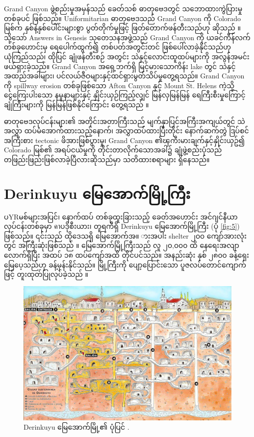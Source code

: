 \documentclass[10pt,twocolumn,letterpaper]{article}
\begin{document}
Grand Canyon ဖွဲ့စည်းမှုအမှန်သည် ခေတ်သစ် ဓာတုဗေဒတွင် သဘောထားကွဲပြားမှုတစ်ခုပင် ဖြစ်သည်။ Uniformitarian ဓာတုဗေဒသည် Grand Canyon ကို Colorado မြစ်က နှစ်နဲ့နှစ်ပေါင်းများစွာ ပွတ်တိုက်မှုဖြင့် ဖြတ်တောက်ဖန်တီးသည်ဟု ဆိုသည် \cite{47}။ သို့သော် Answers in Genesis သုတေသနအဖွဲ့သည် Grand Canyon ကို ယခင်ကီန်လက်တစ်ခုဟောင်းမှ ရေပေါက်ထွက်၍ တစ်ပတ်အတွင်းတင် ဖြစ်ပေါ်လာခဲ့နိုင်သည်ဟု ယုံကြည်သည်၊ ထိုပြင် ချုံဖန်တီးစဉ် အတွင်း သဲနှင့်လောင်းထူထပ်များကို အလွန်အမင်း ဖယ်ရှားခဲ့သည်။ Grand Canyon အရှေ့ဘက်ရှိ မြင့်မားသောကိန်း lake တွင် သဲနှင့်အထည်အခါများ၊ ပင်လယ်ဇီဝများနှင့်ထင်ရှားမွတ်သိပ်မှုတွေ့ရသည်။ Grand Canyon ကို spillway erosion တစ်ခုဖြစ်သော Afton Canyon နှင့် Mount St. Helens ကဲ့သို့ ငွေကြေးပါးသော နမူနာများနှင့် နှိုင်းယှဉ်ကြည့်လျှင် မြန်လှမြန်မြန် ရေကြီးစီးမှုကြောင့် ချုံကြီးများကို မြန်မြန်ဖြစ်နိုင်ကြောင်း တွေ့ရသည် \cite{48}။

ဓာတုဗေဒလုပ်ငန်းများ၏ အတိုင်းအတာကြီးသည် မျက်နှာပြင်အကြီးအကျယ်တွင် သဲအလွှာ ထပ်မံအောက်ထားသည့်နောက်၊ အလွှာထပ်ထားပြီးတိုင်း နောက်ဆက်တွဲ ဒြပ်စင်အကြီးစား tectonic ဖိအားဖြစ်ပွားမှု၊ Grand Canyon ၏ၾကီးမားချက်နှင့်နှိုင်းယှဥ်၍ Colorado မြစ်၏ အရပ်ငယ်မှုကို တိုင်းတာလိုက်သောအခါ၌ ချုံဖွဲ့စည်းပုံသည် တဖြည်းဖြည်းဖြစ်လာခဲ့ပြီလားဆိုသည်မှာ သတိထားစရာများ ရှိနေသည်။

\section{Derinkuyu မြေအောက်မြို့ကြီး}

ပYRမစ်များအပြင်၊ နောက်ထပ် တစ်ခုထူးခြားသည့် ခေတ်အဟောင်း အင်ဂျင်နီယာလုပ်ငန်းတစ်ခုမှာ คาပဒိုစီးယား၊ တူရကီရှိ Derinkuyu မြေအောက်မြို့ကြီး (ပုံ \ref{fig:5}) ဖြစ်သည်။ ၎င်းသည် ထိုဒေသရှိ မြေအောက်အ။
ားအပါး shelter ၂၀၀ ကျော်အားလုံးတွင် အကြီးဆုံးဖြစ်သည် \cite{54}။ မြေအောက်မြို့ကြီးသည် လူ ၂၀,၀၀၀ ထိ နေရေးအလျာလောက်ရှိပြီး အထပ် ၁၈ ထပ်ကျော်အထိ တိုင်ပင်သည်။ အနည်းဆုံး နှစ် ၂၈၀၀ ခန့်ရှေးမြေပေ့သည်ဟု ခန့်မှန်းနိုင်သည်။ မြို့ကြီးကို ပျော့ပြောင်းသော ပူဇလပ်တောင်ကျောက်ဖြင့် တူးထုတ်ပြုလုပ်ခဲ့သည် \cite{52, 53}။

\begin{figure}[b]
\begin{center}
   \includegraphics[width=1\linewidth]{derinkuyu.jpeg}
\end{center}
   \caption{Derinkuyu မြေအောက်မြို့၏ ပုံပြင် \cite{56}.}
\label{fig:5}
\label{fig:onecol}
\end{figure}
\end{document}
